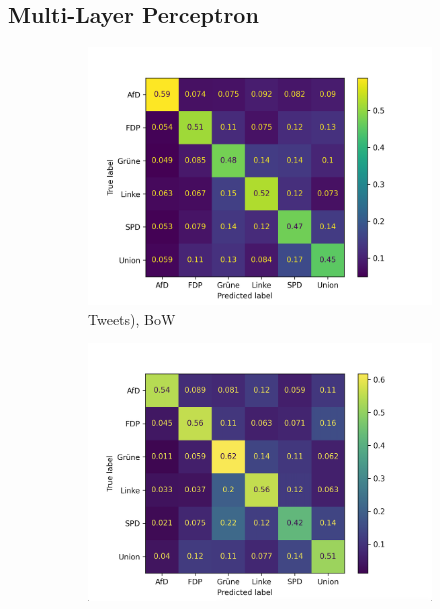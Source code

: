 \subsection*{Multi-Layer Perceptron}

\begin{figure}[H]
\centering
\begin{subfigure}{0.49\textwidth}
    \includegraphics[width=\textwidth]{data/images/modeling/mlp/none/tweets_confusion_matrix.png}
    \caption{Tweets), \ac{BoW}}
    \label{sfig:confusionMatrixMlpTweetsUnbalanced}
\end{subfigure}
\hfill
\begin{subfigure}{0.49\textwidth}
    \includegraphics[width=\textwidth]{data/images/modeling/mlp/none/party_programs_confusion_matrix.png}

\end{subfigure}
\end{figure}
